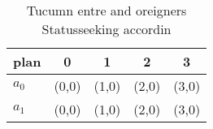 \documentclass[a4paper]{article}
\begin{document}
\begin{table}
\begin{adjustbox}{width=0.8\columnwidth}
\begin{tabular}{|l|l|l|l|l|}
\hline
\textbf{plan} & \multicolumn{1}{c|}{\textbf{0}} & \multicolumn{1}{c|}{\textbf{1}} & \multicolumn{1}{c|}{\textbf{2}} & \multicolumn{1}{c|}{\textbf{3}} \\ \hline
\textbf{$a_0$}  & (0,0) & (1,0) & (2,0) & (3,0) \\ \hline
\textbf{$a_1$}  & (0,0) & (1,0) & (2,0) & (3,0) \\ \hline
\end{tabular}
\end{adjustbox}
\caption{Tucumn entre and oreigners Statusseeking accordin
}
\end{table}
\end{document}
